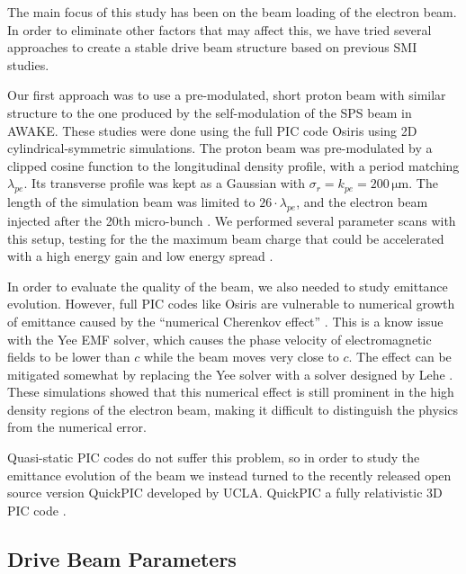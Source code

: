 \documentclass[aps,prstab,reprint,amsmath,amssymb,groupedaddress]{revtex4-1}
\newcommand{\unit}[1]{\,\mathrm{#1}}
\begin{document}
The main focus of this study has been on the beam loading of the electron beam. In order to eliminate other factors that
may affect this, we have tried several approaches to create a stable drive beam structure based on previous SMI studies.

Our first approach was to use a pre-modulated, short proton beam with similar structure to the one produced by the
self-modulation of the SPS beam in AWAKE. These studies were done using the full PIC code Osiris \cite{fonseca:2002}
using 2D cylindrical-symmetric simulations. The proton beam was pre-modulated by a clipped cosine function to the
longitudinal density profile, with a period matching $\lambda_{pe}$. Its transverse profile was kept as a Gaussian with
$\sigma_{r} = k_{pe} = 200\unit{\mu m}$. The length of the simulation beam was limited to $26\cdot\lambda_{pe}$, and the
electron beam injected after the 20th micro-bunch \cite{berglyd_olsen:2015}. We performed several parameter scans with
this setup, testing for the the maximum beam charge that could be accelerated with a high energy gain and low energy
spread \cite{adli:2016, berglyd_olsen:2016}.

In order to evaluate the quality of the beam, we also needed to study emittance evolution. However, full PIC codes like
Osiris are vulnerable to numerical growth of emittance caused by the ``numerical Cherenkov effect'' \cite{godfrey:1974}.
This is a know issue with the Yee EMF solver, which causes the phase velocity of electromagnetic fields to be lower than
$c$ while the beam moves very close to $c$. The effect can be mitigated somewhat by replacing the Yee solver with a
solver designed by Lehe \cite{lehe:2013}. These simulations showed that this numerical effect is still prominent in the
high density regions of the electron beam, making it difficult to distinguish the physics from the numerical error.

Quasi-static PIC codes do not suffer this problem, so in order to study the emittance evolution of the beam we instead
turned to the recently released open source version QuickPIC developed by UCLA. QuickPIC a fully relativistic 3D PIC
code \cite{huang:2006, an:2013}.

\subsection[\label{S:M:Setup}]{Drive Beam Parameters}
\end{document}

